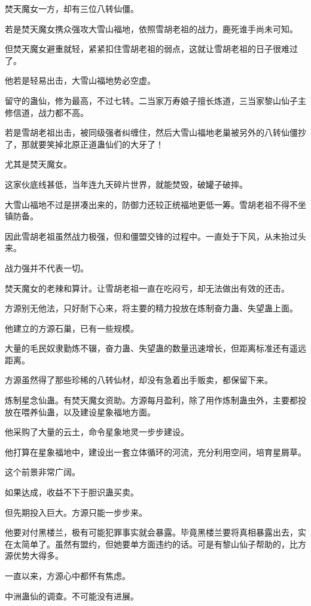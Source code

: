\begin{this_body}
焚天魔女一方，却有三位八转仙僵。

若是焚天魔女携众强攻大雪山福地，依照雪胡老祖的战力，鹿死谁手尚未可知。

但焚天魔女避重就轻，紧紧扣住雪胡老祖的弱点，这就让雪胡老祖的日子很难过了。

他若是轻易出击，大雪山福地势必空虚。

留守的蛊仙，修为最高，不过七转。二当家万寿娘子擅长炼道，三当家黎山仙子主修信道，战力都不高。

若是雪胡老祖出击，被同级强者纠缠住，然后大雪山福地老巢被另外的八转仙僵抄了，那就要笑掉北原正道蛊仙们的大牙了！

尤其是焚天魔女。

这家伙底线甚低，当年连九天碎片世界，就能焚毁，破罐子破摔。

大雪山福地不过是拼凑出来的，防御力还较正统福地更低一筹。雪胡老祖不得不坐镇防备。

因此雪胡老祖虽然战力极强，但和僵盟交锋的过程中。一直处于下风，从未抬过头来。

战力强并不代表一切。

焚天魔女的老辣和算计。让雪胡老祖一直在吃闷亏，却无法做出有效的还击。

方源别无他法，只好耐下心来，将主要的精力投放在炼制奋力蛊、失望蛊上面。

他建立的方源石巢，已有一些规模。

大量的毛民奴隶勤炼不辍，奋力蛊、失望蛊的数量迅速增长，但距离标准还有遥远距离。

方源虽然得了那些珍稀的八转仙材，却没有急着出手贩卖，都保留下来。

炼制星念仙蛊。有焚天魔女资助。方源每月盈利，除了用作炼制蛊虫外，主要都投放在喂养仙蛊，以及建设星象福地方面。

他采购了大量的云土，命令星象地灵一步步建设。

他打算在星象福地中，建设出一套立体循环的河流，充分利用空间，培育星屑草。

这个前景非常广阔。

如果达成，收益不下于胆识蛊买卖。

但先期投入巨大。方源只能一步步来。

他要对付黑楼兰，极有可能犯罪事实就会暴露。毕竟黑楼兰要将真相暴露出去，实在太简单了。虽然有盟约，但她要单方面违约的话。可是有黎山仙子帮助的，比方源优势大得多。

一直以来，方源心中都怀有焦虑。

中洲蛊仙的调查。不可能没有进展。


\end{this_body}

